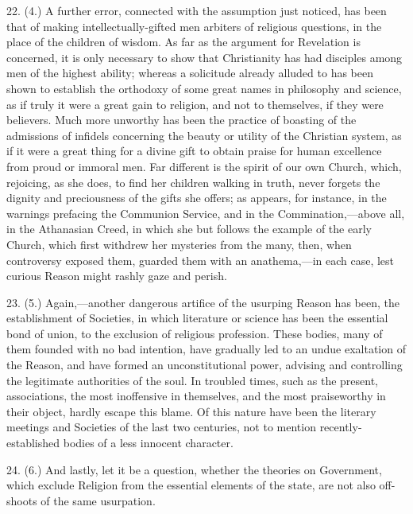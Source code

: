 22. (4.) A further error, connected with the assumption just
noticed, has been that of making intellectually-gifted men arbiters of
religious questions, in the place of the children of wisdom. As far as
the argument for Revelation is concerned, it is only necessary to show
that Christianity has had disciples among men of the highest ability;
whereas a solicitude already alluded to has been shown to establish
the orthodoxy of some great names in philosophy and science, as if
truly it were a great gain to religion, and not to themselves, if they
were believers. Much more unworthy has been the practice of boasting
of the admissions of infidels concerning the beauty or utility of the
Christian system, as if it were a great thing for a divine gift to
obtain praise for human excellence from proud or immoral men. Far
different is the spirit of our own Church, which, rejoicing, as she
does, to find her children walking in truth, never forgets the dignity
and preciousness of the gifts she offers; as appears, for instance, in
the warnings prefacing the Communion Service, and in the Commination,—above
all, in the Athanasian Creed, in which she but follows the example of
the early Church, which first withdrew her mysteries from the many,
then, when controversy exposed them, guarded them with an anathema,—in
each case, lest curious Reason might rashly gaze and perish.

23. (5.) Again,—another dangerous artifice of the usurping Reason
has been, the establishment of Societies, in which literature or
science has been the essential bond of union, to the exclusion of
religious profession. These bodies, many of them founded with no bad
intention, have gradually led to an undue exaltation of the Reason,
and have formed an unconstitutional power, advising and controlling
the legitimate authorities of the soul. In troubled times, such as the
present, associations, the most inoffensive in themselves, and the
most praiseworthy in their object, hardly escape this blame. Of this
nature have been the literary meetings and Societies of the last two
centuries, not to mention recently-established bodies of a less
innocent character.

24. (6.) And lastly, let it be a question, whether the theories on
Government, which exclude Religion from the essential elements of the
state, are not also off-shoots of the same usurpation.

